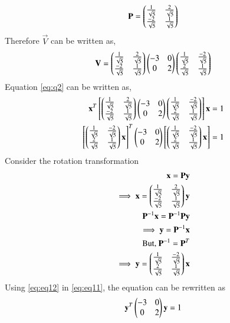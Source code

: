 \documentclass[journal,12pt,twocolumn]{IEEEtran}
\begin{document}
\begin{align}
    \mathbf{P} = \begin{pmatrix}\frac{1}{\sqrt{5}}&\frac{2}{\sqrt{5}}\\\frac{-2}{\sqrt{5}}&\frac{1}{\sqrt{5}}\end{pmatrix} \label{eq:eq15}
\end{align}
Therefore $\vec{V}$ can be written as,
\begin{align}
    \mathbf{V}=\begin{pmatrix}\frac{1}{\sqrt{5}}&\frac{2}{\sqrt{5}}\\\frac{-2}{\sqrt{5}}&\frac{1}{\sqrt{5}}\end{pmatrix}\begin{pmatrix}-3&0\\0&2\end{pmatrix}\begin{pmatrix}\frac{1}{\sqrt{5}}&\frac{-2}{\sqrt{5}}\\\frac{2}{\sqrt{5}}&\frac{1}{\sqrt{5}}\end{pmatrix}
\end{align}
Equation \eqref{eq:q2} can be written as,
\begin{align}
    \mathbf{x}^T\left[\begin{pmatrix}\frac{1}{\sqrt{5}}&\frac{2}{\sqrt{5}}\\\frac{-2}{\sqrt{5}}&\frac{1}{\sqrt{5}}\end{pmatrix}\begin{pmatrix}-3&0\\0&2\end{pmatrix}\begin{pmatrix}\frac{1}{\sqrt{5}}&\frac{-2}{\sqrt{5}}\\\frac{2}{\sqrt{5}}&\frac{1}{\sqrt{5}}\end{pmatrix}\right]\mathbf{x}=1\\
  \left[\begin{pmatrix}\frac{1}{\sqrt{5}}&\frac{-2}{\sqrt{5}}\\\frac{2}{\sqrt{5}}&\frac{1}{\sqrt{5}}\end{pmatrix}\mathbf{x}\right]^T\begin{pmatrix}-3&0\\0&2\end{pmatrix}\left[\begin{pmatrix}\frac{1}{\sqrt{5}}&\frac{-2}{\sqrt{5}}\\\frac{2}{\sqrt{5}}&\frac{1}{\sqrt{5}}\end{pmatrix}\mathbf{x}\right]= 1\label{eq:eq11}
\end{align}
Consider the rotation transformation 
\begin{align}
  \mathbf{x}=\mathbf{P}\mathbf{y}\\
  \implies \mathbf{x}=\begin{pmatrix}\frac{1}{\sqrt{5}}&\frac{2}{\sqrt{5}}\\\frac{-2}{\sqrt{5}}&\frac{1}{\sqrt{5}}\end{pmatrix}\mathbf{y}\label{eq:eq12}\\
  \mathbf{P}^{-1}\mathbf{x}=\mathbf{P}^{-1}\mathbf{P}\mathbf{y}\\
  \implies \mathbf{y}= \mathbf{P}^{-1}\mathbf{x}\\
  \text{But, }\mathbf{P}^{-1}=\mathbf{P}^T\\
  \implies \mathbf{y}=\begin{pmatrix}\frac{1}{\sqrt{5}}&\frac{-2}{\sqrt{5}}\\\frac{2}{\sqrt{5}}&\frac{1}{\sqrt{5}}\end{pmatrix}\mathbf{x} \label{eq:eq12}
\end{align}
Using \eqref{eq:eq12} in \eqref{eq:eq11}, the equation can be rewritten as
\begin{align}
     \mathbf{y}^T\begin{pmatrix}-3&0\\0&2\end{pmatrix}\mathbf{y}=1 \label{eq:eq13}
\end{align}
\end{document}
